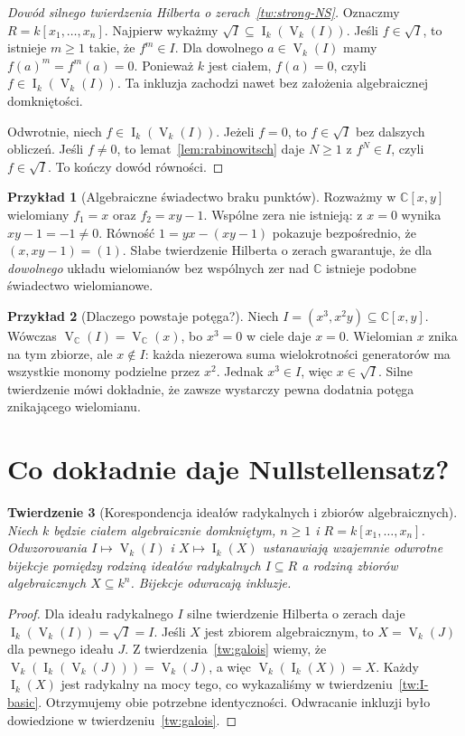 \documentclass[11pt,a4paper,openany]{report}
\numberwithin{equation}{section}
\theoremstyle{plain}
\newtheorem{twierdzenie}{Twierdzenie}[section]
\theoremstyle{definition}
\newtheorem{przyklad}[twierdzenie]{Przykład}
\theoremstyle{remark}
\newcommand{\C}{\mathbb C}
\newcommand{\V}{\operatorname V}
\newcommand{\I}{\operatorname I}
\begin{document}
\begin{proof}[Dowód silnego twierdzenia Hilberta o zerach~\ref{tw:strong-NS}]
Oznaczmy $R=k[x_1,\dots,x_n]$.
Najpierw wykażmy $\sqrt I\subseteq\I_k(\V_k(I))$.
Jeśli $f\in\sqrt I$, to istnieje $m\ge1$ takie,
że $f^m\in I$. Dla dowolnego $a\in\V_k(I)$ mamy
$f(a)^m=f^m(a)=0$. Ponieważ $k$ jest ciałem,
$f(a)=0$, czyli $f\in\I_k(\V_k(I))$.
Ta inkluzja zachodzi nawet bez założenia algebraicznej domkniętości.

Odwrotnie, niech $f\in\I_k(\V_k(I))$.
Jeżeli $f=0$, to $f\in\sqrt I$ bez dalszych obliczeń.
Jeśli $f\ne0$, to lemat~\ref{lem:rabinowitsch}
daje $N\ge1$ z $f^N\in I$, czyli $f\in\sqrt I$.
To kończy dowód równości.
\end{proof}

\begin{przyklad}[Algebraiczne świadectwo braku punktów]
Rozważmy w $\C[x,y]$ wielomiany $f_1=x$ oraz
$f_2=xy-1$. Wspólne zera nie istnieją: z $x=0$
wynika $xy-1=-1\ne0$.
Równość $1=yx-(xy-1)$ pokazuje bezpośrednio,
że $(x,xy-1)=(1)$.
Słabe twierdzenie Hilberta o zerach gwarantuje,
że dla \emph{dowolnego} układu wielomianów bez wspólnych
zer nad $\C$ istnieje podobne świadectwo wielomianowe.
\end{przyklad}

\begin{przyklad}[Dlaczego powstaje potęga?]
Niech $I=(x^3,x^2y)\subseteq\C[x,y]$.
Wówczas $\V_{\C}(I)=\V_{\C}(x)$, bo $x^3=0$
w ciele daje $x=0$. Wielomian $x$ znika na tym zbiorze,
ale $x\notin I$: każda niezerowa suma wielokrotności
generatorów ma wszystkie monomy podzielne przez $x^2$.
Jednak $x^3\in I$, więc $x\in\sqrt I$.
Silne twierdzenie mówi dokładnie, że zawsze wystarczy
pewna dodatnia potęga znikającego wielomianu.
\end{przyklad}

\section{Co dokładnie daje Nullstellensatz?}

\begin{twierdzenie}[Korespondencja ideałów radykalnych i zbiorów algebraicznych]
\label{tw:radical-correspondence}
Niech $k$ będzie ciałem algebraicznie domkniętym, $n\ge1$
i $R=k[x_1,\dots,x_n]$.
Odwzorowania $I\mapsto\V_k(I)$ i $X\mapsto\I_k(X)$
ustanawiają wzajemnie odwrotne bijekcje pomiędzy rodziną
ideałów radykalnych $I\subseteq R$ a rodziną
zbiorów algebraicznych $X\subseteq k^n$.
Bijekcje odwracają inkluzje.
\end{twierdzenie}
\begin{proof}
Dla ideału radykalnego $I$ silne twierdzenie Hilberta o zerach
daje $\I_k(\V_k(I))=\sqrt I=I$.
Jeśli $X$ jest zbiorem algebraicznym, to $X=\V_k(J)$
dla pewnego ideału $J$. Z twierdzenia~\ref{tw:galois}
wiemy, że $\V_k(\I_k(\V_k(J)))=\V_k(J)$,
a więc $\V_k(\I_k(X))=X$.
Każdy $\I_k(X)$ jest radykalny na mocy
tego, co wykazaliśmy w twierdzeniu~\ref{tw:I-basic}.
Otrzymujemy obie potrzebne identyczności.
Odwracanie inkluzji było dowiedzione w twierdzeniu~\ref{tw:galois}.
\end{proof}
\end{document}
